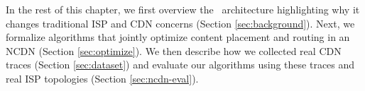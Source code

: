 


In the rest of this chapter, we first overview the \ncp\ architecture highlighting why it changes traditional ISP and CDN concerns (Section \ref{sec:background}). Next, we formalize algorithms that jointly optimize content placement and routing in an NCDN (Section \ref{sec:optimize}). We then describe how we collected real CDN traces (Section \ref{sec:dataset}) and evaluate our algorithms using these traces and real ISP topologies (Section \ref{sec:ncdn-eval}). 



